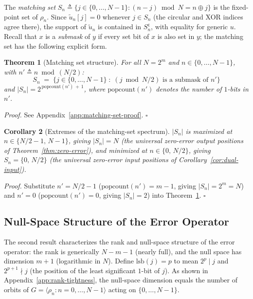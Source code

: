 \documentclass[10pt,a4paper]{amsart}
\newtheorem{theorem}{Theorem}
\newtheorem{corollary}[theorem]{Corollary}
\begin{document}
\noindent The \emph{matching set} $S_n \triangleq \{j \in \{0,\ldots,N-1\} : (n-j)\bmod N = n \oplus j\}$ is the fixed-point set of $\rho_n$. Since $\tilde{u}_n[j] = 0$ whenever $j \in S_n$ (the circular and XOR indices agree there), the support of $\tilde{u}_n$ is contained in $S_n^{\mathsf{c}}$, with equality for generic $u$. Recall that $x$ is a \emph{submask} of $y$ if every set bit of $x$ is also set in $y$; the matching set has the following explicit form.

\medskip
\begin{theorem}[Matching set structure]\label{thm:matching-set}
For all $N = 2^m$ and $n \in \{0,\ldots,N-1\}$, with $n' \triangleq n \bmod (N/2)$:
\begin{equation}
    S_n \;=\; \bigl\{j \in \{0,\ldots,N-1\} \;:\; (j \bmod N/2) \text{ is a submask of } n'\bigr\}
\end{equation}
and $|S_n| = 2^{\,\mathrm{popcount}(n')\,+\,1}$, where $\mathrm{popcount}(n')$ denotes the number of $1$-bits in $n'$.
\end{theorem}

\medskip
\noindent\textit{Proof.} See Appendix~\ref{app:matching-set-proof}. $\square$

\begin{corollary}[Extremes of the matching-set spectrum]\label{cor:extremes}
$|S_n|$ is maximized at $n \in \{N/2-1,\,N-1\}$, giving $|S_n| = N$ (the universal zero-error output positions of Theorem~\ref{thm:zero-error}), and minimized at $n \in \{0,\,N/2\}$, giving $S_n = \{0,\,N/2\}$ (the universal zero-error input positions of Corollary~\ref{cor:dual-input}).
\end{corollary}

\noindent\textit{Proof.} Substitute $n' = N/2-1$ ($\mathrm{popcount}(n') = m-1$, giving $|S_n| = 2^m = N$) and $n' = 0$ ($\mathrm{popcount}(n') = 0$, giving $|S_n| = 2$) into Theorem~\ref{thm:matching-set}. $\square$

\subsection{Null-Space Structure of the Error Operator}
\label{sec:null-space}

The second result characterizes the rank and null-space structure of the error operator: the rank is generically $N-m-1$ (nearly full), and the null space has dimension $m+1$ (logarithmic in $N$). Define $\mathrm{lsb}(j) = p$ to mean $2^p \mid j$ and $2^{p+1} \nmid j$ (the position of the least significant $1$-bit of $j$). As shown in Appendix~\ref{app:rank-tightness}, the null-space dimension equals the number of orbits of $G = \langle\rho_n : n=0,\ldots,N-1\rangle$ acting on $\{0,\ldots,N-1\}$.
\end{document}
